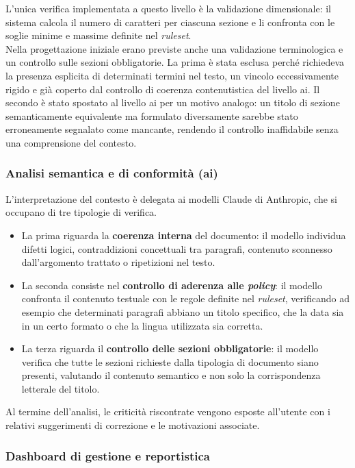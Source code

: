 L'unica verifica implementata a questo livello è la validazione dimensionale: il sistema calcola il numero di caratteri per ciascuna sezione e li confronta con le soglie minime e massime definite nel \emph{ruleset}.\\

Nella progettazione iniziale erano previste anche una validazione terminologica e un controllo sulle sezioni obbligatorie. La prima è stata esclusa perché richiedeva la presenza esplicita di determinati termini nel testo, un vincolo eccessivamente rigido e già coperto dal controllo di coerenza contenutistica del livello \gls{ai}. Il secondo è stato spostato al livello \gls{ai} per un motivo analogo: un titolo di sezione semanticamente equivalente ma formulato diversamente sarebbe stato erroneamente segnalato come mancante, rendendo il controllo inaffidabile senza una comprensione del contesto.


\subsubsection{Analisi semantica e di conformità (\gls{ai})}
L'interpretazione del contesto è delegata ai modelli Claude di Anthropic, che si occupano di tre tipologie di verifica.

\begin{itemize}
    \item La prima riguarda la \textbf{coerenza interna} del documento: il modello individua difetti logici, contraddizioni concettuali tra paragrafi, contenuto sconnesso dall'argomento trattato o ripetizioni nel testo.
    \item La seconda consiste nel \textbf{controllo di aderenza alle \emph{policy}}: il modello confronta il contenuto testuale con le regole definite nel \emph{ruleset}, verificando ad esempio che determinati paragrafi abbiano un titolo specifico, che la data sia in un certo formato o che la lingua utilizzata sia corretta.
    \item La terza riguarda il \textbf{controllo delle sezioni obbligatorie}: il modello verifica che tutte le sezioni richieste dalla tipologia di documento siano presenti, valutando il contenuto semantico e non solo la corrispondenza letterale del titolo.
\end{itemize}

Al termine dell'analisi, le criticità riscontrate vengono esposte all'utente con i relativi suggerimenti di correzione e le motivazioni associate.


\subsubsection{Dashboard di gestione e reportistica}

